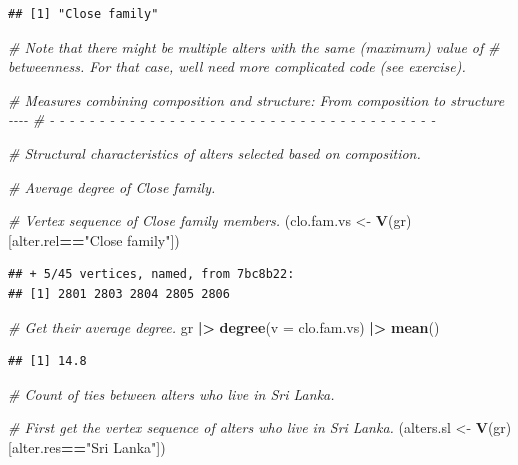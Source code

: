 \documentclass[
]{book}
\newenvironment{Shaded}{\begin{snugshade}}{\end{snugshade}}
\newcommand{\AttributeTok}[1]{\textcolor[rgb]{0.13,0.29,0.53}{#1}}
\newcommand{\CommentTok}[1]{\textcolor[rgb]{0.56,0.35,0.01}{\textit{#1}}}
\newcommand{\FunctionTok}[1]{\textcolor[rgb]{0.13,0.29,0.53}{\textbf{#1}}}
\newcommand{\NormalTok}[1]{#1}
\newcommand{\OtherTok}[1]{\textcolor[rgb]{0.56,0.35,0.01}{#1}}
\newcommand{\SpecialCharTok}[1]{\textcolor[rgb]{0.81,0.36,0.00}{\textbf{#1}}}
\newcommand{\StringTok}[1]{\textcolor[rgb]{0.31,0.60,0.02}{#1}}
\begin{document}
\begin{verbatim}
## [1] "Close family"
\end{verbatim}

\begin{Shaded}
\begin{Highlighting}[]
\CommentTok{\# Note that there might be multiple alters with the same (maximum) value of }
\CommentTok{\# betweenness. For that case, we\textquotesingle{}ll need more complicated code (see exercise).}

\CommentTok{\# Measures combining composition and structure: From composition to structure {-}{-}{-}{-}}
\CommentTok{\# {-} {-} {-} {-} {-} {-} {-} {-} {-} {-} {-} {-} {-} {-} {-} {-} {-} {-} {-} {-} {-} {-} {-} {-} {-} {-} {-} {-} {-} {-} {-} {-} {-} {-} {-} {-} {-} {-} {-} }

\CommentTok{\# Structural characteristics of alters selected based on composition.}

\CommentTok{\# Average degree of Close family.}

\CommentTok{\# Vertex sequence of Close family members.}
\NormalTok{(clo.fam.vs }\OtherTok{\textless{}{-}} \FunctionTok{V}\NormalTok{(gr)[alter.rel}\SpecialCharTok{==}\StringTok{"Close family"}\NormalTok{])}
\end{Highlighting}
\end{Shaded}

\begin{verbatim}
## + 5/45 vertices, named, from 7bc8b22:
## [1] 2801 2803 2804 2805 2806
\end{verbatim}

\begin{Shaded}
\begin{Highlighting}[]
\CommentTok{\# Get their average degree.}
\NormalTok{gr }\SpecialCharTok{|\textgreater{}}
  \FunctionTok{degree}\NormalTok{(}\AttributeTok{v =}\NormalTok{ clo.fam.vs) }\SpecialCharTok{|\textgreater{}} 
  \FunctionTok{mean}\NormalTok{()}
\end{Highlighting}
\end{Shaded}

\begin{verbatim}
## [1] 14.8
\end{verbatim}

\begin{Shaded}
\begin{Highlighting}[]
\CommentTok{\# Count of ties between alters who live in Sri Lanka.}

\CommentTok{\# First get the vertex sequence of alters who live in Sri Lanka.}
\NormalTok{(alters.sl }\OtherTok{\textless{}{-}} \FunctionTok{V}\NormalTok{(gr)[alter.res}\SpecialCharTok{==}\StringTok{"Sri Lanka"}\NormalTok{])}
\end{Highlighting}
\end{Shaded}
\end{document}

